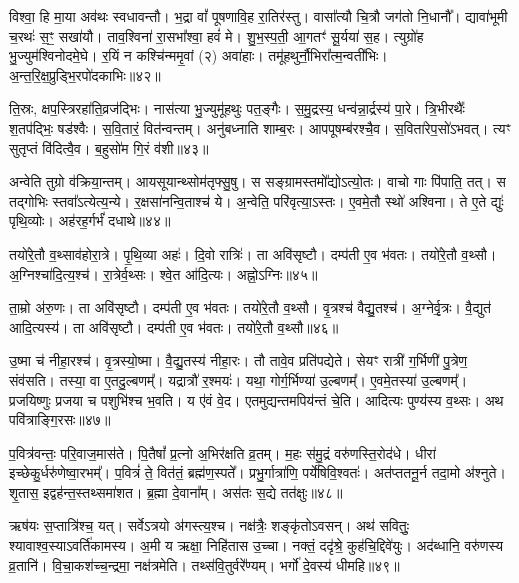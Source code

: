 विश्वा॒ हि मा॒या अव॑थः स्वधावन्तौ। 
भ॒द्रा वां᳚ पूषणावि॒ह रा॒तिर॑स्तु। वासा᳚त्यौ चि॒त्रौ जग॑तो नि॒धानौ᳚। 
द्यावा॑भूमी च॒रथः॑ स॒ꣳ॒ सखा॑यौ। ताव॒श्विना॑ रा॒सभा᳚श्वा॒ हवं॑ मे। 
शु॒भ॒स्प॒ती॒ आ॒गतꣳ॑ सू॒र्यया॑ स॒ह। त्युग्रो॑ह भु॒ज्युम॑श्विनोदमे॒घे। 
र॒यिं न कश्चि॑न्ममृ॒वां (२) अवा॑हाः। तमू॑हथुर्नौ॒भिरा᳚त्म॒न्वती॑भिः। 
अ॒न्त॒रि॒क्ष॒प्रुड्भि॒रपो॑दकाभिः॥४२॥


ति॒स्रः, क्षप॒स्त्रिरहा॑ति॒व्रज॑द्भिः। नास॑त्या भु॒ज्युमू॑हथुः पत॒ङ्गैः। 
स॒मु॒द्रस्य॒ धन्व॑न्ना॒र्द्रस्य॑ पा॒रे। त्रि॒भीरथैः᳚ श॒तप॑द्भिः॒ षड॑श्वैः। 
स॒वि॒तारं॒ वित॑न्वन्तम्। अनु॑बध्नाति शाम्ब॒रः। आपपू\ur{}षम्ब॑रश्चै॒व। 
स॒विता॑रेप॒सो॑ऽभवत्। त्यꣳ सुतृप्तं वि॑दित्वै॒व। ब॒हुसो॑म गि॒रं व॑शी॥४३॥

अन्वेति तुग्रो व॑क्रिया॒न्तम्। आयसूयान्थ्सोम॑तृफ्सु॒षु। स \linebreak सङ्ग्रामस्तमो᳚द्योऽत्यो॒तः। 
वाचो गाः पि॑पाति॒ तत्। स तद्गोभिः स्तवा᳚ऽत्येत्य॒न्ये। र॒क्षसा॑नन्वि॒ताश्च॑ ये। 
अ॒न्वेति॒ परि॑वृत्या॒ऽस्तः। ए॒वमे॒तौ स्थो॑ अश्विना। 
ते ए॒ते द्युः॑ पृथि॒व्योः। अह॑रह॒र्गर्भं॑ दधाथे॥४४॥

तयो॑रे॒तौ व॒थ्साव॑होरा॒त्रे। पृ॒थि॒व्या अहः॑। दि॒वो रात्रिः॑। 
ता अवि॑सृष्टौ। दम्प॑ती ए॒व भ॑वतः। तयो॑रे॒तौ व॒थ्सौ। 
अ॒ग्निश्चा॑दि॒त्य॒श्च॑। रा॒त्रेर्व॒थ्सः। श्वे॒त आ॑दि॒त्यः। अह्नो॒ऽग्निः॥४५॥

ता॒म्रो अ॑रु॒णः। ता अवि॑सृष्टौ। दम्प॑ती ए॒व भ॑वतः। 
तयो॑रे॒तौ व॒थ्सौ। वृ॒त्रश्च॑ वैद्यु॒तश्च॑। अ॒ग्नेर्वृ॒त्रः। वै॒द्युत॑ आदि॒त्यस्य॑। 
ता अवि॑सृष्टौ। दम्प॑ती ए॒व भ॑वतः। तयो॑रे॒तौ व॒थ्सौ॥४६॥


उ॒ष्मा च॑ नीहा॒रश्च॑। वृ॒त्रस्यो॒ष्मा। वै॒द्यु॒तस्य॑ नीहा॒रः। 
तौ तावे॒व प्रति॑पद्येते। सेयꣳ रात्री॑ ग॒र्भिणी॑ पु॒त्रेण॒ संव॑सति। 
तस्या॒ वा ए॒तदु॒ल्बणम्‌᳚। यद्रात्रौ॑ र॒श्मयः॑। 
यथा॒ गोर्ग॒र्भिण्या॑ उ॒ल्बणम्‌᳚। ए॒वमे॒तस्या॑ उ॒ल्बणम्‌᳚। 
प्रजयिष्णुः प्रजया च पशुभि॑श्च भ॒वति। 
य ए॑वं वे॒द। एतमुद्यन्तमपिय॑न्तं चे॒ति। 
आदित्यः पुण्य॑स्य व॒थ्सः। अथ पवि॑त्राङ्गि॒रसः॥४७॥\anuvakamend


प॒वित्र॑वन्तः॒ परि॒वाज॒मास॑ते। पि॒तैषां᳚ प्र॒त्नो अ॒भिर॑क्षति व्र॒तम्। 
म॒हः स॑मु॒द्रं वरु॑णस्ति॒रोद॑धे। धीरा॑ इच्छेकु॒र्धरु॑णेष्वा॒रभम्‌᳚। 
प॒वित्रं॑ ते॒ वित॑तं॒ ब्रह्म॑ण॒स्पते᳚। प्रभु॒र्गात्रा॑णि॒ पर्ये॑षिवि॒श्वतः॑। 
अत॑प्ततनू॒र्न तदा॒मो अ॑श्नुते। शृ॒तास॒ इद्वह॑न्त॒स्तथ्समा॑शत। 
ब्र॒ह्मा दे॒वाना᳚म्। अस॑तः स॒द्ये तत॑क्षुः॥४८॥


ऋष॑यः स॒प्तात्रि॑श्च॒ यत्। सर्वेऽत्रयो अ॑गस्त्य॒श्च। 
नक्ष॑त्रैः॒ शङ्कृ॑तोऽवसन्। अथ॑ सवितुः॒ श्यावाश्व॒स्याऽवर्ति॑कामस्य। 
अ॒मी य ऋक्षा॒ निहि॑तास उ॒च्चा। नक्तं॒ ददृ॑श्रे॒ कुह॑चि॒द्दिवे॑युः। 
अद॑ब्धानि॒ वरु॑णस्य व्र॒तानि॑। वि॒चा॒कश॑च्च॒न्द्रमा॒ नक्ष॑त्रमेति। 
तथ्स॑वि॒तुर्वरे᳚ण्यम्। भर्गो॑ दे॒वस्य॑ धीमहि॥४९॥


